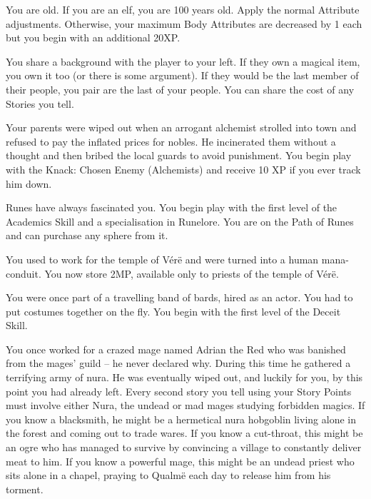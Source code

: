 \begin{multicols}{2}
\begin{list}{\addtocounter{list}{1}\textbf{:}}{\raggedleft}
\item{You are old.  If you are an elf, you are 100 years old.  Apply the normal Attribute adjustments.  Otherwise, your maximum Body Attributes are decreased by 1 each but you begin with an additional 20XP.}

\item{You share a background with the player to your left.  If they own a magical item, you own it too (or there is some argument).  If they would be the last member of their people, you pair are the last of your people.  You can share the cost of any Stories you tell.}

\item{Your parents were wiped out when an arrogant alchemist strolled into town and refused to pay the inflated prices for nobles.  He incinerated them without a thought and then bribed the local guards to avoid punishment.  You begin play with the Knack: Chosen Enemy (Alchemists) and receive 10 XP if you ever track him down.}

\item{Runes have always fascinated you.  You begin play with the first level of the Academics Skill and a specialisation in Runelore.  You are on the Path of Runes and can purchase any sphere from it.}

\item{You used to work for the temple of V\'{e}r\"{e} and were turned into a human mana-conduit.  You now store 2MP, available only to priests of the temple of V\'{e}r\"{e}.}

\item{You were once part of a travelling band of bards, hired as an actor.  You had to put costumes together on the fly.  You begin with the first level of the Deceit Skill.}

\item{You once worked for a crazed mage named Adrian the Red who was banished from the mages' guild -- he never declared why.  During this time he gathered a terrifying army of nura.  He was eventually wiped out, and luckily for you, by this point you had already left.  Every second story you tell using your Story Points must involve either Nura, the undead or mad mages studying forbidden magics.  If you know a blacksmith, he might be a hermetical nura hobgoblin living alone in the forest and coming out to trade wares.  If you know a cut-throat, this might be an ogre who has managed to survive by convincing a village to constantly deliver meat to him.  If you know a powerful mage, this might be an undead priest who sits alone in a chapel, praying to Qualm\"{e} each day to release him from his torment.}


\end{list}
\end{multicols}
